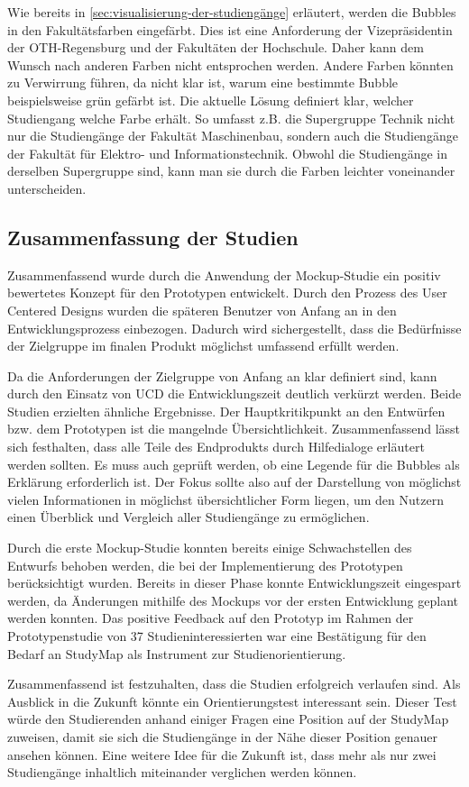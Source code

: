 Wie bereits in \autoref{sec:visualisierung-der-studiengänge} erläutert, werden die Bubbles in den Fakultätsfarben eingefärbt. Dies ist eine Anforderung der Vizepräsidentin der OTH-Regensburg und der Fakultäten der Hochschule. Daher kann dem Wunsch nach anderen Farben nicht entsprochen werden. Andere Farben könnten zu Verwirrung führen, da nicht klar ist, warum eine bestimmte Bubble beispielsweise grün gefärbt ist. Die aktuelle Lösung definiert klar, welcher Studiengang welche Farbe erhält. So umfasst z.B. die Supergruppe Technik nicht nur die Studiengänge der Fakultät Maschinenbau, sondern auch die Studiengänge der Fakultät für Elektro- und Informationstechnik. Obwohl die Studiengänge in derselben Supergruppe sind, kann man sie durch die Farben leichter voneinander unterscheiden.

\subsection{Zusammenfassung der Studien}
Zusammenfassend wurde durch die Anwendung der Mockup-Studie ein positiv bewertetes Konzept für den Prototypen entwickelt. Durch den Prozess des User Centered Designs wurden die späteren Benutzer von Anfang an in den Entwicklungsprozess einbezogen. Dadurch wird sichergestellt, dass die Bedürfnisse der Zielgruppe im finalen Produkt möglichst umfassend erfüllt werden.

Da die Anforderungen der Zielgruppe von Anfang an klar definiert sind, kann durch den Einsatz von UCD die Entwicklungszeit deutlich verkürzt werden. Beide Studien erzielten ähnliche Ergebnisse. Der Hauptkritikpunkt an den Entwürfen bzw. dem Prototypen ist die mangelnde Übersichtlichkeit. Zusammenfassend lässt sich festhalten, dass alle Teile des Endprodukts durch Hilfedialoge erläutert werden sollten. Es muss auch geprüft werden, ob eine Legende für die Bubbles als Erklärung erforderlich ist. Der Fokus sollte also auf der Darstellung von möglichst vielen Informationen in möglichst übersichtlicher Form liegen, um den Nutzern einen Überblick und Vergleich aller Studiengänge zu ermöglichen.

Durch die erste Mockup-Studie konnten bereits einige Schwachstellen des Entwurfs behoben werden, die bei der Implementierung des Prototypen berücksichtigt wurden. Bereits in dieser Phase konnte Entwicklungszeit eingespart werden, da Änderungen mithilfe des Mockups vor der ersten Entwicklung geplant werden konnten. Das positive Feedback auf den Prototyp im Rahmen der Prototypenstudie von 37 Studieninteressierten war eine Bestätigung für den Bedarf an StudyMap als Instrument zur Studienorientierung.

Zusammenfassend ist festzuhalten, dass die Studien erfolgreich verlaufen sind. Als Ausblick in die Zukunft könnte ein Orientierungstest interessant sein. Dieser Test würde den Studierenden anhand einiger Fragen eine Position auf der StudyMap zuweisen, damit sie sich die Studiengänge in der Nähe dieser Position genauer ansehen können. Eine weitere Idee für die Zukunft ist, dass mehr als nur zwei Studiengänge inhaltlich miteinander verglichen werden können.